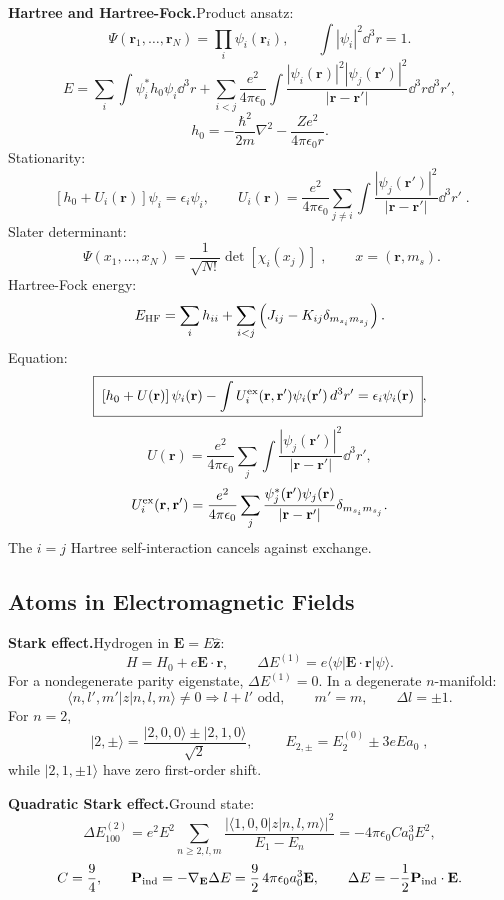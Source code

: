 \noindent\textbf{Hartree and Hartree-Fock.}\quad Product ansatz:
\[
\Psi(\mathbf r_1,\ldots,\mathbf r_N)=\prod_i\psi_i(\mathbf r_i),\qquad
\int|\psi_i|^2\dd^3r=1.
\]
\[
E=\sum_i\int\psi_i^*h_0\psi_i\dd^3r
+\sum_{i<j}\frac{e^2}{4\pi\epsilon_0}
\int\frac{|\psi_i(\mathbf r)|^2|\psi_j(\mathbf r')|^2}
{|\mathbf r-\mathbf r'|}\dd^3r\dd^3r',
\]
\[
h_0=-\frac{\hbar^2}{2m}\nabla^2-\frac{Ze^2}{4\pi\epsilon_0r}.
\]
Stationarity:
\[
\boxed{\;\left[h_0+U_i(\mathbf r)\right]\psi_i=\epsilon_i\psi_i,\qquad
U_i(\mathbf r)=\frac{e^2}{4\pi\epsilon_0}\sum_{j\ne i}
\int\frac{|\psi_j(\mathbf r')|^2}{|\mathbf r-\mathbf r'|}\dd^3r'\;}.
\]
Slater determinant:
\[
\boxed{\;\Psi(x_1,\ldots,x_N)=\frac1{\sqrt{N!}}\det[\chi_i(x_j)]\;},
\qquad x=(\mathbf r,m_s).
\]
Hartree-Fock energy:
\[
E_{\rm HF}=\sum_i h_{ii}
+\sum_{i<j}\left(J_{ij}-K_{ij}\delta_{m_{s_i}m_{s_j}}\right).
\]
Equation:
\[
\boxed{\;\left[h_0+U(\mathbf r)\right]\psi_i(\mathbf r)
-\int U_i^{\rm ex}(\mathbf r,\mathbf r')\psi_i(\mathbf r')\,d^3r'
=\epsilon_i\psi_i(\mathbf r)\;},
\]
\[
U(\mathbf r)=\frac{e^2}{4\pi\epsilon_0}\sum_j
\int\frac{|\psi_j(\mathbf r')|^2}{|\mathbf r-\mathbf r'|}\dd^3r',
\]
\[
U_i^{\rm ex}(\mathbf r,\mathbf r')
=\frac{e^2}{4\pi\epsilon_0}\sum_j
\frac{\psi_j^*(\mathbf r')\psi_j(\mathbf r)}
{|\mathbf r-\mathbf r'|}\delta_{m_{s_i}m_{s_j}}.
\]
The $i=j$ Hartree self-interaction cancels against exchange.

\subsection{Atoms in Electromagnetic Fields}

\noindent\textbf{Stark effect.}\quad Hydrogen in $\mathbf E=E\hat{\mathbf z}$:
\[
H=H_0+e\mathbf E\cdot\mathbf r,\qquad
\Delta E^{(1)}=e\langle\psi|\mathbf E\cdot\mathbf r|\psi\rangle.
\]
For a nondegenerate parity eigenstate, $\Delta E^{(1)}=0$. In a degenerate
$n$-manifold:
\[
\langle n,l',m'|z|n,l,m\rangle\ne0
\Longrightarrow l+l'\text{ odd},\qquad m'=m,\qquad \Delta l=\pm1.
\]
For $n=2$,
\[
|2,\pm\rangle=\frac{|2,0,0\rangle\pm|2,1,0\rangle}{\sqrt2},\qquad
\boxed{\;E_{2,\pm}=E_2^{(0)}\pm3eEa_0\;},
\]
while $|2,1,\pm1\rangle$ have zero first-order shift.

\noindent\textbf{Quadratic Stark effect.}\quad Ground state:
\[
\Delta E_{100}^{(2)}
=e^2E^2\sum_{n\ge2,l,m}
\frac{|\langle1,0,0|z|n,l,m\rangle|^2}{E_1-E_n}
=-4\pi\epsilon_0C a_0^3E^2,
\]
\[
C=\frac94,\qquad
\mathbf P_{\rm ind}=-\nabla_{\mathbf E}\Delta E
=\frac92\,4\pi\epsilon_0a_0^3\mathbf E,\qquad
\Delta E=-\frac12\mathbf P_{\rm ind}\cdot\mathbf E.
\]

